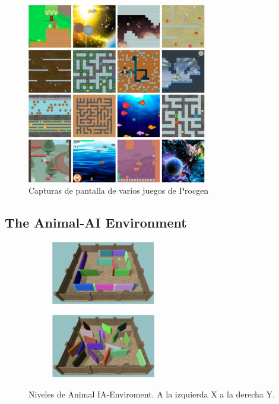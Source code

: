 \begin{figure}[ht!]
    \centering
    \includegraphics[width=0.7\textwidth]{Graphics/procgen.jpeg}
    \caption{Capturas de pantalla de varios juegos de Procgen}
    \label{fig:procgen}
\end{figure}

\subsection{The Animal-AI Environment}

\begin{figure}[ht!]
    \begin{subfigure}
      \centering
      \includegraphics[width=0.5\textwidth]{Graphics/animal_1.png}
      \label{fig:animal1}
    \end{subfigure}%
    \begin{subfigure}
      \centering
      \includegraphics[width=0.5\textwidth]{Graphics/animal_3.png}
      \label{fig:animal2}
    \end{subfigure}%
    \caption{Niveles de Animal IA-Enviroment. A la izquierda X a la derecha Y.}
    \label{fig:animal}
\end{figure}


